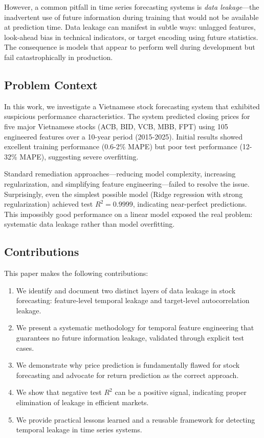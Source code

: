 \documentclass[conference]{IEEEtran}
\begin{document}
However, a common pitfall in time series forecasting systems is \textit{data leakage}—the inadvertent use of future information during training that would not be available at prediction time. Data leakage can manifest in subtle ways: unlagged features, look-ahead bias in technical indicators, or target encoding using future statistics. The consequence is models that appear to perform well during development but fail catastrophically in production.

\subsection{Problem Context}

In this work, we investigate a Vietnamese stock forecasting system that exhibited suspicious performance characteristics. The system predicted closing prices for five major Vietnamese stocks (ACB, BID, VCB, MBB, FPT) using 105 engineered features over a 10-year period (2015-2025). Initial results showed excellent training performance (0.6-2\% MAPE) but poor test performance (12-32\% MAPE), suggesting severe overfitting.

Standard remediation approaches—reducing model complexity, increasing regularization, and simplifying feature engineering—failed to resolve the issue. Surprisingly, even the simplest possible model (Ridge regression with strong regularization) achieved test $R^2 = 0.9999$, indicating near-perfect predictions. This impossibly good performance on a linear model exposed the real problem: systematic data leakage rather than model overfitting.

\subsection{Contributions}

This paper makes the following contributions:

\begin{enumerate}
    \item We identify and document two distinct layers of data leakage in stock forecasting: feature-level temporal leakage and target-level autocorrelation leakage.
    \item We present a systematic methodology for temporal feature engineering that guarantees no future information leakage, validated through explicit test cases.
    \item We demonstrate why price prediction is fundamentally flawed for stock forecasting and advocate for return prediction as the correct approach.
    \item We show that negative test $R^2$ can be a positive signal, indicating proper elimination of leakage in efficient markets.
    \item We provide practical lessons learned and a reusable framework for detecting temporal leakage in time series systems.
\end{enumerate}
\end{document}
